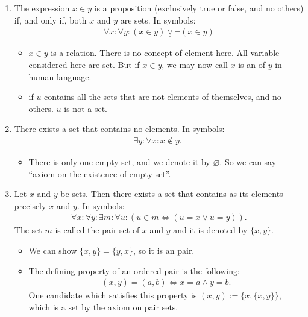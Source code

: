 \documentclass{article}
\begin{document}
\begin{enumerate}
    \item {} The expression $x \in y$ is a proposition (exclusively true or false, and no others) if, and only if, both $x$ and $y$ are sets. In symbols:
\begin{align*}
\forall x: \forall y:(x \in y) \underline{\vee} \neg(x \in y)
\end{align*}
    \begin{itemize}
        \item $x \in y$ is a relation. There is no concept of element here. All variable considered here are set. But if $x \in y$, we may now call $x$ is an  of $y$ in human language.
        \item {} if $u$ contains all the sets that are not elements of themselves, and no others. $u$ is not a set. 
    \end{itemize}
    \item {} There exists a set that contains no elements. In symbols:
\begin{align*}
\exists y: \forall x: x \notin y \text {. }
\end{align*}
\begin{itemize}
    \item  There is only one empty set, and we denote it by $\varnothing$. So we can say ``axiom on the existence of  empty set''.
\end{itemize}
\item {} Let $x$ and $y$ be sets. Then there exists a set that contains as its elements precisely $x$ and $y$. In symbols:
\begin{align*}
\forall x: \forall y: \exists m: \forall u:(u \in m \Leftrightarrow(u=x \vee u=y)) .
\end{align*}
The set $m$ is called the pair set of $x$ and $y$ and it is denoted by $\{x, y\}$.
\begin{itemize}
    \item We can show $\{x, y\} = \{y, x\}$, so it is an  pair.
\item The defining property of an ordered pair is the following:
\begin{align*}
(x, y)=(a, b) \Leftrightarrow x=a \wedge y=b .
\end{align*}
One candidate which satisfies this property is $(x, y):=\{x,\{x, y\}\}$, which is a set by the axiom on pair sets.

\end{itemize}
\end{enumerate}
\end{document}
